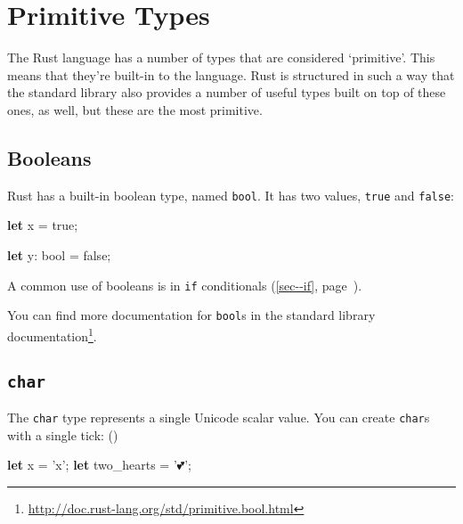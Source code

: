 \documentclass[a4paper,]{book}
\renewcommand*{\hyperlink}[2]{%
 #2 (\autoref{#1}, page~\pageref{#1})}
\newenvironment{Shaded}{\begin{snugshade}}{\end{snugshade}}
\newcommand{\KeywordTok}[1]{\textcolor[rgb]{0.13,0.29,0.53}{\textbf{{#1}}}}
\newcommand{\DataTypeTok}[1]{\textcolor[rgb]{0.13,0.29,0.53}{{#1}}}
\newcommand{\ConstantTok}[1]{\textcolor[rgb]{0.00,0.00,0.00}{{#1}}}
\newcommand{\CharTok}[1]{\textcolor[rgb]{0.31,0.60,0.02}{{#1}}}
\newcommand{\NormalTok}[1]{{#1}}
\renewcommand{\href}[2]{#2\footnote{\url{#1}}}
\begin{document}
\section{Primitive Types}\label{sec--primitive-types}

The Rust language has a number of types that are considered `primitive'.
This means that they're built-in to the language. Rust is structured in
such a way that the standard library also provides a number of useful
types built on top of these ones, as well, but these are the most
primitive.

\subsection{Booleans}\label{booleans}

Rust has a built-in boolean type, named \texttt{bool}. It has two
values, \texttt{true} and \texttt{false}:

\begin{Shaded}
\begin{Highlighting}[]
\KeywordTok{let} \NormalTok{x = }\ConstantTok{true}\NormalTok{;}

\KeywordTok{let} \NormalTok{y: }\DataTypeTok{bool} \NormalTok{= }\ConstantTok{false}\NormalTok{;}
\end{Highlighting}
\end{Shaded}

A common use of booleans is in \protect\hyperlink{sec--if}{\texttt{if}
conditionals}.

You can find more documentation for \texttt{bool}s
\href{http://doc.rust-lang.org/std/primitive.bool.html}{in the standard
library documentation}.

\subsection{\texorpdfstring{\texttt{char}}{char}}\label{char}

The \texttt{char} type represents a single Unicode scalar value. You can
create \texttt{char}s with a single tick: (\texttt{\textquotesingle{}})

\begin{Shaded}
\begin{Highlighting}[]
\KeywordTok{let} \NormalTok{x = }\CharTok{'x'}\NormalTok{;}
\KeywordTok{let} \NormalTok{two_hearts = }\CharTok{'💕'}\NormalTok{;}
\end{Highlighting}
\end{Shaded}
\end{document}
